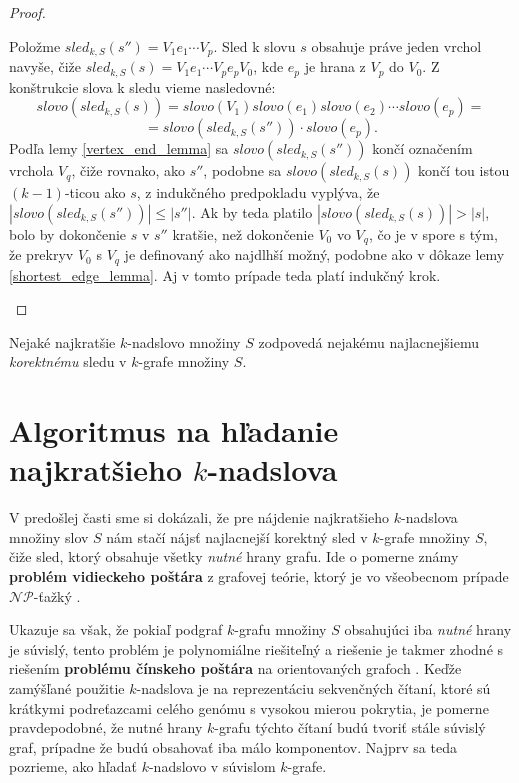 \begin{proof}
\begin{itemize}
                      Položme $sled_{k,S}(s'') = V_1 e_1 \cdots V_p$. Sled k slovu $s$ obsahuje práve jeden vrchol navyše, čiže $sled_{k,S}(s) = V_1 e_1 \cdots V_p e_p V_0$,
                      kde $e_p$ je hrana z $V_p$ do $V_0$. Z konštrukcie slova k sledu vieme nasledovné: \\
                      $$slovo(sled_{k,S}(s)) = slovo(V_1) slovo(e_1) slovo(e_2) \cdots slovo(e_p) = $$
                      $$ = slovo(sled_{k,S}(s'')) \cdot slovo(e_p).$$
                        Podľa lemy \ref{vertex_end_lemma} sa $slovo(sled_{k,S}(s''))$ končí označením vrchola $V_q$, čiže rovnako, ako $s''$,
                      podobne sa $slovo(sled_{k,S}(s))$ končí tou istou $(k-1)$-ticou ako $s$, z indukčného predpokladu vyplýva, že $|slovo(sled_{k,S}(s''))| \leq |s''|$.
                      Ak by teda platilo $|slovo(sled_{k,S}(s))| > |s|$, bolo by dokončenie $s$ v $s''$ kratšie, než dokončenie $V_0$ vo $V_q$,
                      čo je v spore s tým, že prekryv $V_0$ s $V_q$ je definovaný ako najdlhší možný, podobne ako v dôkaze lemy \ref{shortest_edge_lemma}.
                      Aj v tomto prípade teda platí indukčný krok. \qedhere
            \end{itemize}
    
\end{proof}

\begin{dosl}
    Nejaké najkratšie $k$-nadslovo množiny $S$ zodpovedá nejakému najlacnejšiemu \emph{korektnému} sledu v $k$-grafe množiny $S$.
\end{dosl}

\section{Algoritmus na hľadanie najkratšieho $k$-nadslova}

V predošlej časti sme si dokázali, že pre nájdenie najkratšieho $k$-nadslova množiny slov $S$
nám stačí nájsť najlacnejší korektný sled v $k$-grafe množiny $S$, čiže sled, ktorý obsahuje
všetky \emph{nutné} hrany grafu. Ide o pomerne známy \textbf{problém vidieckeho poštára} z grafovej teórie,
ktorý je vo všeobecnom prípade $\mathcal{NP}$-ťažký \cite{ruralpostman}.

Ukazuje sa však, že pokiaľ podgraf $k$-grafu množiny $S$ obsahujúci iba \emph{nutné} hrany je súvislý,
tento problém je polynomiálne riešiteľný a riešenie je takmer zhodné s riešením \textbf{problému čínskeho
poštára} na orientovaných grafoch \cite{rural_postman_connected}. Keďže zamýšľané použitie $k$-nadslova je na reprezentáciu sekvenčných čítaní, ktoré sú
krátkymi podreťazcami celého genómu s vysokou mierou pokrytia, je pomerne pravdepodobné, že nutné hrany
$k$-grafu týchto čítaní budú tvoriť stále súvislý graf, prípadne že budú obsahovať iba málo komponentov.
Najprv sa teda pozrieme, ako hľadať $k$-nadslovo v súvislom $k$-grafe.

